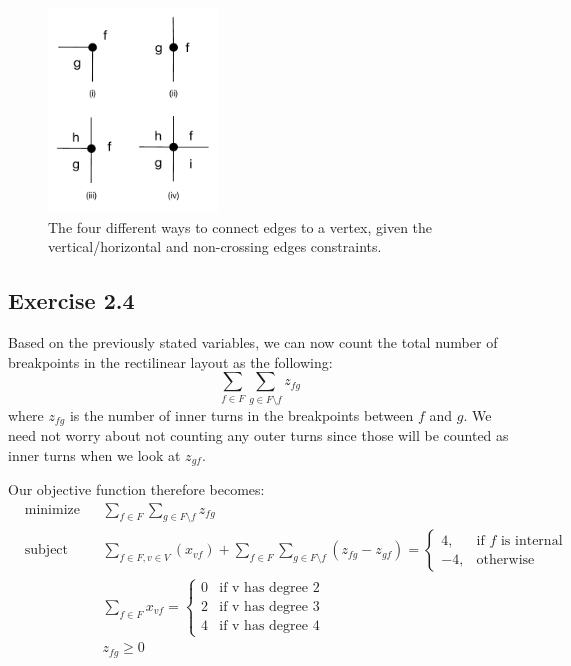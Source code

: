\documentclass[12pt]{article}
\begin{document}
\begin{figure}[h]
    \centering
      \includegraphics[width=0.4\textwidth]{figures/e2_3}
    \caption{The four different ways to connect edges to a vertex, given the vertical/horizontal and non-crossing edges constraints.}
    \label{fig:e2_3}
\end{figure}

\subsection*{Exercise 2.4}

  Based on the previously stated variables, we can now count the total number of breakpoints in the rectilinear layout as the following:
  $$\sum_{f \in F}\sum_{g \in F \setminus f} z_{fg}$$
  where $z_{fg}$ is the number of inner turns in the breakpoints between $f$ and $g$. We need not worry about not counting any outer turns since those will be counted as inner turns when we look at $z_{gf}$.

  Our objective function therefore becomes:
  \begin{equation*}
    \begin{aligned}
    & {\text{minimize}}
    & & \sum_{f \in F}\sum_{g \in F \setminus f} z_{fg} \\
    & \text{subject to}
    & & \sum_{f \in F, v \in V}(x_{vf}) + \sum_{f \in F}\sum_{g \in F \setminus f}(z_{fg} - z_{gf}) = \begin{cases}
                                                                                      4, & \text{if } f \text{ is internal}\\
                                                                                      -4, & \text{otherwise}
                                                                                     \end{cases} \\
    & & &  \sum_{f \in F}{x_{vf}} = \begin{cases}
                                        0 & \text{if v has degree 2}\\
                                        2 & \text{if v has degree 3}\\
                                        4 & \text{if v has degree 4}
                                    \end{cases}\\
    & & & z_{fg} \geq 0
    \end{aligned}
  \end{equation*}
\end{document}
